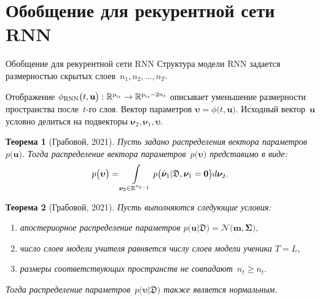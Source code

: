 \documentclass[10pt,pdf,hyperref={unicode}]{beamer}
\newtheorem{rustheorem}{Теорема}
\begin{document}
\section{Обобщение для рекурентной сети RNN}
\justifying
\begin{frame}{Обобщение для рекурентной сети RNN}
Структура модели RNN задается размерностью скрытых слоев~$n_1, n_2, \ldots, n_T.$

Отображение
$
\setlength\abovedisplayskip{0pt}
\phi_{\text{RNN}}\bigr(t, \mathbf{u}\bigr) : \mathbb{R}^{\text{p}_{\text{tr}}} \to \mathbb{R}^{\text{p}_{\text{tr}}-2n_t}
\setlength\belowdisplayskip{0pt}
$
описывает уменьшение размерности пространства после~$t$-го слоя. Вектор параметров $\bm{\upsilon} =  \phi\bigr(t, \mathbf{u}\bigr).$ Исходный вектор~$\mathbf{u}$ условно делиться на подвекторы $\bm{\nu}_2, {\bm{\nu}}_1, \bm{\upsilon}.$

\begin{rustheorem}[Грабовой, 2021]
\justifying
Пусть задано распределения вектора параметров~$p\bigr(\mathbf{u}\bigr).$ Тогда распределение вектора параметров~$p\bigr(\bm{\upsilon}\bigr)$ представимо в виде:
\[
\setlength\abovedisplayskip{0pt}
p\bigr(\bm{\upsilon}\bigr)  = \int\limits_{ \bm{\nu}_2 \in \mathbb{R}^{n_{t-1}}}p\bigr(\bar{\bm{\nu}}_1|\mathfrak{D}, \bm{\nu}_1=\mathbf{0}\bigr) d \bm{\nu}_2.
\setlength\belowdisplayskip{0pt}
\]
\end{rustheorem}

\begin{rustheorem}[Грабовой, 2021]
\justifying
Пусть выполняются следующие условия:
\begin{enumerate}[1)]
\item апостериорное распределение параметров $p\bigr(\mathbf{u}|\mathfrak{D}\bigr) = \mathcal{N}\bigr(\mathbf{m}, \bm{\Sigma}\bigr),$
\item число слоев модели учителя равняется числу слоев модели ученика $T=L$,
\item размеры соответствующих пространств не совпадают~$n_t \geq n_t.$
\end{enumerate}
Тогда распределение параметров~$p\bigr(\bm{\upsilon}|\mathfrak{D}\bigr)$ также является нормальным.
\end{rustheorem}

\end{frame}
\end{document}
